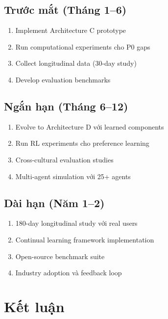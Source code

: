 \documentclass[10pt,leqno]{amsart}
\begin{document}
\subsection{Trước mắt (Tháng 1--6)}

\begin{enumerate}
    \item Implement Architecture C prototype
    \item Run computational experiments cho P0 gaps
    \item Collect longitudinal data (30-day study)
    \item Develop evaluation benchmarks
\end{enumerate}

\subsection{Ngắn hạn (Tháng 6--12)}

\begin{enumerate}
    \item Evolve to Architecture D với learned components
    \item Run RL experiments cho preference learning
    \item Cross-cultural evaluation studies
    \item Multi-agent simulation với 25+ agents
\end{enumerate}

\subsection{Dài hạn (Năm 1--2)}

\begin{enumerate}
    \item 180-day longitudinal study với real users
    \item Continual learning framework implementation
    \item Open-source benchmark suite
    \item Industry adoption và feedback loop
\end{enumerate}


\section{Kết luận}
\end{document}
